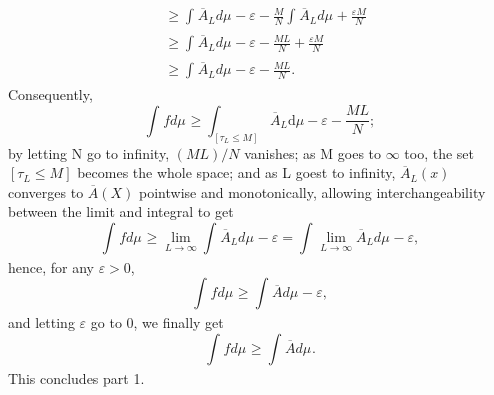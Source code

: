\documentclass[../fractals_everywhere.tex]{subfiles}
\begin{document}
\begin{proof*}
\begin{align*}
		                                                                                               & \geq \int_{}\overline{A}_{L} d\mu_{}-\varepsilon -\frac{M}{N}\int_{}\overline{A}_{L} d\mu_{}+\frac{\varepsilon M}{N} \\
		                                                                                               & \geq \int_{}\overline{A}_{L} d\mu_{}-\varepsilon -\frac{ML}{N}+\frac{\varepsilon M}{N}                               \\
		                                                                                               & \geq \int_{}\overline{A}_{L} d\mu_{}-\varepsilon -\frac{ML}{N}.
	\end{align*}
	Consequently,
	\[
		\int_{}f d\mu_{} \geq \int_{[\tau_{L}\leq M]}^{}\overline{A}_{L} \mathrm{d}\mu -\varepsilon -\frac{ML}{N};
	\]
	by letting N go to infinity, \((ML)/N\) vanishes; as M goes to \(\infty\) too, the set \([\tau_{L}\leq M]\) becomes the whole space; and as L goest to infinity, \(\overline{A}_{L}(x)\) converges to \(\overline{A}(X)\) pointwise and monotonically, allowing interchangeability between the limit and integral to get
	\[
		\int_{}f d\mu_{}\geq \lim_{L\to \infty}\int_{}\overline{A}_{L} d\mu_{}-\varepsilon =\int_{}\lim_{L\to \infty}\overline{A}_{L} d\mu_{}-\varepsilon,
	\]
	hence, for any \(\varepsilon > 0\),
	\[
		\int_{}f d\mu_{} \geq \int_{}\overline{A} d\mu_{} - \varepsilon ,
	\]
	and letting \(\varepsilon \) go to 0, we finally get
	\[
		\int_{}f d\mu_{}\geq \int_{}\overline{A} d\mu_{}.
	\]
	This concludes part 1.
\end{proof*}
\end{document}
